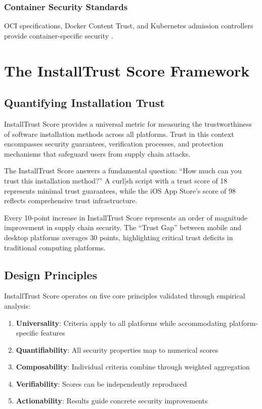 \documentclass[11pt,a4paper]{article}
\begin{document}
\subsubsection{Container Security Standards}

OCI specifications, Docker Content Trust, and Kubernetes admission controllers provide container-specific security \cite{kubernetes2024security,docker2024supply}.

\section{The InstallTrust Score Framework}

\subsection{Quantifying Installation Trust}

InstallTrust Score provides a universal metric for measuring the trustworthiness of software installation methods across all platforms. Trust in this context encompasses security guarantees, verification processes, and protection mechanisms that safeguard users from supply chain attacks.

The InstallTrust Score answers a fundamental question: ``How much can you trust this installation method?'' A curl|sh script with a trust score of 18 represents minimal trust guarantees, while the iOS App Store's score of 98 reflects comprehensive trust infrastructure.

Every 10-point increase in InstallTrust Score represents an order of magnitude improvement in supply chain security. The ``Trust Gap'' between mobile and desktop platforms averages 30 points, highlighting critical trust deficits in traditional computing platforms.

\subsection{Design Principles}

InstallTrust Score operates on five core principles validated through empirical analysis:

\begin{enumerate}
    \item \textbf{Universality}: Criteria apply to all platforms while accommodating platform-specific features
    \item \textbf{Quantifiability}: All security properties map to numerical scores
    \item \textbf{Composability}: Individual criteria combine through weighted aggregation
    \item \textbf{Verifiability}: Scores can be independently reproduced
    \item \textbf{Actionability}: Results guide concrete security improvements
\end{enumerate}
\end{document}
